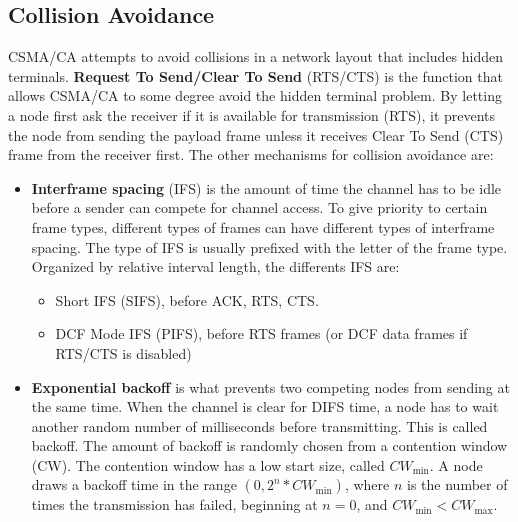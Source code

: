 \documentclass[a4paper,UKenglish]{report}
\begin{document}
\subsection{Collision Avoidance}
CSMA/CA attempts to avoid collisions in a network layout that includes hidden terminals. \textbf{Request To Send/Clear To Send} (RTS/CTS)
is the function that allows CSMA/CA to some degree avoid the hidden terminal problem. By letting a node first ask the receiver if it is
available for transmission (RTS), it prevents the node from sending the payload frame unless it receives Clear To Send (CTS) frame from the receiver first.
The other mechanisms for collision avoidance are: 
\begin{itemize}	
	\item \textbf{Interframe spacing} (IFS) is the amount of time the channel has to be idle before a sender can compete for channel access. 
		To give priority to certain frame types, different types of frames can have different types of interframe spacing. The type of IFS is usually 
		prefixed with the letter of the frame type. Organized by relative interval length, the differents IFS are:
		\begin{itemize} 
			\item Short IFS (SIFS), before ACK, RTS, CTS.  
			\item DCF Mode IFS (PIFS), before RTS frames (or DCF data frames if RTS/CTS is disabled)

		\end{itemize}
	\item \textbf{Exponential backoff} is what prevents two competing nodes from sending at the same time. When the channel is clear
		for DIFS time, a node has to wait another  random number of milliseconds before transmitting. This is called backoff.
		The amount of backoff is randomly chosen from a contention window (CW). The contention window has a low start size,
		called $CW_{\text{min}}$. A node draws a backoff time in the range $(0, 2^n*CW_{\text{min}})$, where $n$ is the number 
		of times the transmission has failed, beginning at $n=0$, and $CW_{\text{min}}<CW_{\text{max}}$.
\end{itemize}
\end{document}
